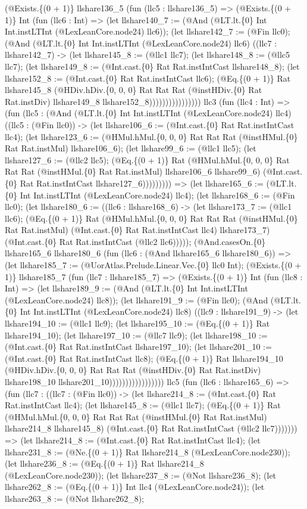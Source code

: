 \documentclass[11pt]{article}
\begin{document}
(@Exists.\{(0 + 1)\} llshare136\_5 (fun (llc5 : llshare136\_5) => (@Exists.\{(0 + 1)\} Int (fun (llc6 : Int) => (let llshare140\_7 := (@And (@LT.lt.\{0\} Int Int.instLTInt (@LexLeanCore.node24) llc6)); (let llshare142\_7 := (@Fin llc0); (@And (@LT.lt.\{0\} Int Int.instLTInt (@LexLeanCore.node24) llc6) ((llc7 : llshare142\_7) -> (let llshare145\_8 := (@llc1 llc7); (let llshare148\_8 := (@llc5 llc7); (let llshare149\_8 := (@Int.cast.\{0\} Rat Rat.instIntCast llshare148\_8); (let llshare152\_8 := (@Int.cast.\{0\} Rat Rat.instIntCast llc6); (@Eq.\{(0 + 1)\} Rat llshare145\_8 (@HDiv.hDiv.\{0, 0, 0\} Rat Rat Rat (@instHDiv.\{0\} Rat Rat.instDiv) llshare149\_8 llshare152\_8)))))))))))))))) llc3 (fun (llc4 : Int) => (fun (llc5 : (@And (@LT.lt.\{0\} Int Int.instLTInt (@LexLeanCore.node24) llc4) ((llc5 : (@Fin llc0)) -> (let llshare106\_6 := (@Int.cast.\{0\} Rat Rat.instIntCast llc4); (let llshare123\_6 := (@HMul.hMul.\{0, 0, 0\} Rat Rat Rat (@instHMul.\{0\} Rat Rat.instMul) llshare106\_6); (let llshare99\_6 := (@llc1 llc5); (let llshare127\_6 := (@llc2 llc5); (@Eq.\{(0 + 1)\} Rat (@HMul.hMul.\{0, 0, 0\} Rat Rat Rat (@instHMul.\{0\} Rat Rat.instMul) llshare106\_6 llshare99\_6) (@Int.cast.\{0\} Rat Rat.instIntCast llshare127\_6))))))))) => (let llshare165\_6 := (@LT.lt.\{0\} Int Int.instLTInt (@LexLeanCore.node24) llc4); (let llshare168\_6 := (@Fin llc0); (let llshare180\_6 := ((llc6 : llshare168\_6) -> (let llshare173\_7 := (@llc1 llc6); (@Eq.\{(0 + 1)\} Rat (@HMul.hMul.\{0, 0, 0\} Rat Rat Rat (@instHMul.\{0\} Rat Rat.instMul) (@Int.cast.\{0\} Rat Rat.instIntCast llc4) llshare173\_7) (@Int.cast.\{0\} Rat Rat.instIntCast (@llc2 llc6))))); (@And.casesOn.\{0\} llshare165\_6 llshare180\_6 (fun (llc6 : (@And llshare165\_6 llshare180\_6)) => (let llshare185\_7 := (@UorAtlas.Prelude.Linear.Vec.\{0\} llc0 Int); (@Exists.\{(0 + 1)\} llshare185\_7 (fun (llc7 : llshare185\_7) => (@Exists.\{(0 + 1)\} Int (fun (llc8 : Int) => (let llshare189\_9 := (@And (@LT.lt.\{0\} Int Int.instLTInt (@LexLeanCore.node24) llc8)); (let llshare191\_9 := (@Fin llc0); (@And (@LT.lt.\{0\} Int Int.instLTInt (@LexLeanCore.node24) llc8) ((llc9 : llshare191\_9) -> (let llshare194\_10 := (@llc1 llc9); (let llshare195\_10 := (@Eq.\{(0 + 1)\} Rat llshare194\_10); (let llshare197\_10 := (@llc7 llc9); (let llshare198\_10 := (@Int.cast.\{0\} Rat Rat.instIntCast llshare197\_10); (let llshare201\_10 := (@Int.cast.\{0\} Rat Rat.instIntCast llc8); (@Eq.\{(0 + 1)\} Rat llshare194\_10 (@HDiv.hDiv.\{0, 0, 0\} Rat Rat Rat (@instHDiv.\{0\} Rat Rat.instDiv) llshare198\_10 llshare201\_10))))))))))))))))) llc5 (fun (llc6 : llshare165\_6) => (fun (llc7 : ((llc7 : (@Fin llc0)) -> (let llshare214\_8 := (@Int.cast.\{0\} Rat Rat.instIntCast llc4); (let llshare145\_8 := (@llc1 llc7); (@Eq.\{(0 + 1)\} Rat (@HMul.hMul.\{0, 0, 0\} Rat Rat Rat (@instHMul.\{0\} Rat Rat.instMul) llshare214\_8 llshare145\_8) (@Int.cast.\{0\} Rat Rat.instIntCast (@llc2 llc7))))))) => (let llshare214\_8 := (@Int.cast.\{0\} Rat Rat.instIntCast llc4); (let llshare231\_8 := (@Ne.\{(0 + 1)\} Rat llshare214\_8 (@LexLeanCore.node230)); (let llshare236\_8 := (@Eq.\{(0 + 1)\} Rat llshare214\_8 (@LexLeanCore.node230)); (let llshare237\_8 := (@Not llshare236\_8); (let llshare262\_8 := (@Eq.\{(0 + 1)\} Int llc4 (@LexLeanCore.node24)); (let llshare263\_8 := (@Not llshare262\_8); 
\end{document}
